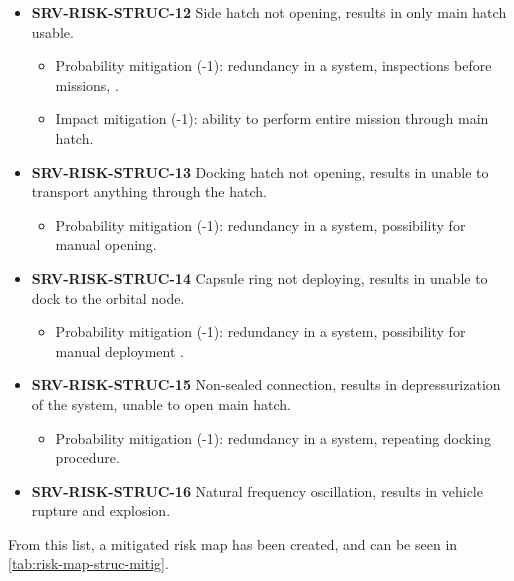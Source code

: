 \begin{itemize}
	 \item \textbf{SRV-RISK-STRUC-12} Side hatch not opening, results in only main hatch usable.
	\begin{itemize}
		 \item Probability mitigation (-1): redundancy in a system, inspections before missions, .		 \item Impact mitigation (-1): ability to perform entire mission through main hatch.	\end{itemize}
	 \item \textbf{SRV-RISK-STRUC-13} Docking hatch not opening, results in unable to transport anything through the hatch.
	\begin{itemize}
		 \item Probability mitigation (-1): redundancy in a system, possibility for manual opening.	\end{itemize}
	 \item \textbf{SRV-RISK-STRUC-14} Capsule ring not deploying, results in unable to dock to the orbital node.
	\begin{itemize}
		 \item Probability mitigation (-1): redundancy in a system, possibility for manual deployment .	\end{itemize}
	 \item \textbf{SRV-RISK-STRUC-15} Non-sealed connection, results in depressurization of the system, unable to open main hatch.
	\begin{itemize}
		 \item Probability mitigation (-1): redundancy in a system, repeating docking procedure.	\end{itemize}
	 \item \textbf{SRV-RISK-STRUC-16} Natural frequency oscillation, results in vehicle rupture and explosion.
\end{itemize}

\noindent From this list, a mitigated risk map has been created, and can be seen in \autoref{tab:risk-map-struc-mitig}.


